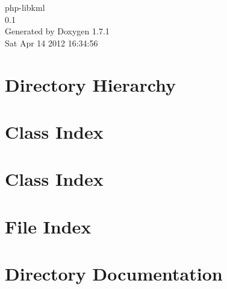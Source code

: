 \documentclass[a4paper]{book}
\begin{document}
\hypersetup{pageanchor=false}
\begin{titlepage}
\vspace*{7cm}
\begin{center}
{\Large php-\/libkml \\[1ex]\large 0.1 }\\
\vspace*{1cm}
{\large Generated by Doxygen 1.7.1}\\
\vspace*{0.5cm}
{\small Sat Apr 14 2012 16:34:56}\\
\end{center}
\end{titlepage}
\clearemptydoublepage
{}
\tableofcontents
\clearemptydoublepage
{}
\hypersetup{pageanchor=true}
\chapter{Directory Hierarchy}

\chapter{Class Index}

\chapter{Class Index}

\chapter{File Index}

\chapter{Directory Documentation}













\end{document}
